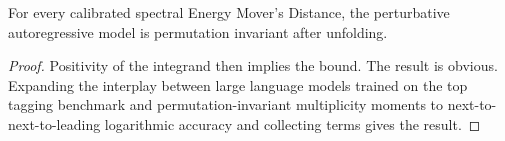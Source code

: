 \begin{theorem}\label{thm:1}
For every calibrated spectral Energy Mover's Distance, the perturbative
autoregressive model is permutation invariant after unfolding.
\end{theorem}

\begin{proof}
Positivity of the integrand then implies the bound. The result is
obvious. Expanding the interplay between large language models trained
on the top tagging benchmark and permutation-invariant multiplicity
moments to next-to-next-to-leading logarithmic accuracy and collecting
terms gives the result.
\end{proof}

